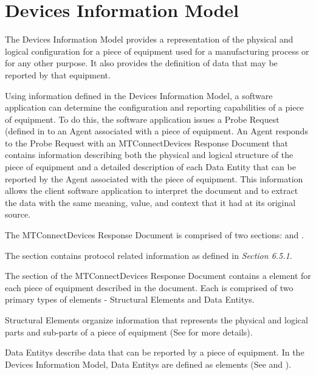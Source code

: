 
\section{Devices Information Model}
\label{sec:Devices Information Model}

The \gls{Devices Information Model} provides a representation of the physical and logical configuration for a piece of equipment used for a manufacturing process or for any other purpose.  It also provides the definition of data that may be reported by that equipment. 

Using information defined in the \gls{Devices Information Model}, a software application can determine the configuration and reporting capabilities of a piece of equipment.  To do this, the software application issues a \gls{Probe Request} (defined in  to an \gls{Agent} associated with a piece of equipment. An \gls{Agent} responds to the \gls{Probe Request} with an \gls{MTConnectDevices Response Document} that contains information describing both the physical and logical structure of the piece of equipment and a detailed description of each \gls{Data Entity} that can be reported by the \gls{Agent} associated with the piece of equipment. This information allows the client software application to interpret the document and to extract the data with the same meaning, value, and context that it had at its original source.  

The \gls{MTConnectDevices Response Document} is comprised of two sections:  and .

The  section contains protocol related information as defined in  \textit{Section 6.5.1}.

The  section of the \gls{MTConnectDevices Response Document} contains a  element for each piece of equipment described in the document.  Each  is comprised of two primary types of elements - \glspl{Structural Element} and \glspl{Data Entity}.  

\glspl{Structural Element} organize information that represents the physical and logical parts and sub-parts of a piece of equipment (See  for more details).  

\glspl{Data Entity} describe data that can be reported by a piece of equipment.  In the \gls{Devices Information Model}, \glspl{Data Entity} are defined as  elements (See  and ).

